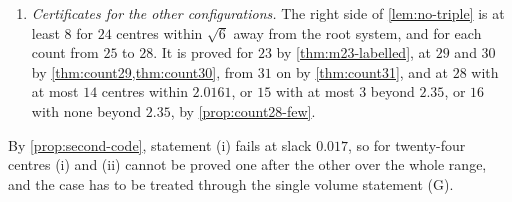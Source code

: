 \documentclass[11pt,reqno]{amsart}
\renewcommand{\_}{\origunderscore\allowbreak}
\numberwithin{equation}{section}
\theoremstyle{plain}
\theoremstyle{definition}
\theoremstyle{remark}
\begin{document}
\begin{enumerate}[label=\textup{(\roman*)},leftmargin=2.2em]
  \cref{thm:certificate} does not give: its margin is $4.4\cdot10^{-5}$,
  and a near-contact at $2+\delta$ removes $S(2+\delta)\approx0.14$.
\item \emph{Certificates for the other configurations.} The right side of
  \cref{lem:no-triple} is at least $8$ for $24$ centres within $\sqrt6$
  away from the root system, and for each count from $25$ to $28$. It is
  proved for $23$ by \cref{thm:m23-labelled}, at $29$ and $30$ by
  \cref{thm:count29,thm:count30}, from $31$ on by \cref{thm:count31}, and at
  $28$ with at most $14$ centres within $2.0161$, or $15$ with at most $3$
  beyond $2.35$, or $16$ with none beyond $2.35$, by \cref{prop:count28-few}.
\end{enumerate}
By \cref{prop:second-code}, statement (i) fails at slack $0.017$, so for
twenty-four centres (i) and (ii) cannot be proved one after the other over
the whole range, and the case has to be treated through the single volume
statement (G).
\end{document}
